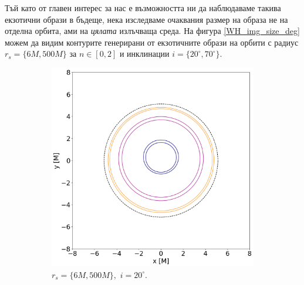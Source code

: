 \documentclass[12pt]{article}
\numberwithin{equation}{section}
\numberwithin{figure}{section}
\begin{document}
	Тъй като от главен интерес за нас е възможността ни да наблюдаваме такива екзотични образи в бъдеще, нека изследваме очаквания размер на образа не на отделна орбита, ами на \emph{цялата} излъчваща среда. На фигура \ref{WH_img_size_deg} можем да видим контурите генерирани от екзотичните образи на орбити с радиус $r_s = \{6M, 500M\}$ за $n\in[0,2]$ и инклинации $i = \{20^\circ,70^\circ\}$.\\
	
	\begin{figure}[!htb]
		\centering
		\begin{subfigure}{6cm}
			\hspace{-1.2cm}
			\includegraphics[scale = 0.35]{Section_6_Morphology_of_the images_of_horizonless_spacetimes/WH_20_deg_r6_r500.png}
			\caption{$r_s = \{6M, 500M\},\,\, i = 20^\circ$.}
		\end{subfigure}\,\,\,
		\begin{subfigure}{6cm}
			\hspace{-0.7cm}

\end{subfigure}
\end{figure}
\end{document}
